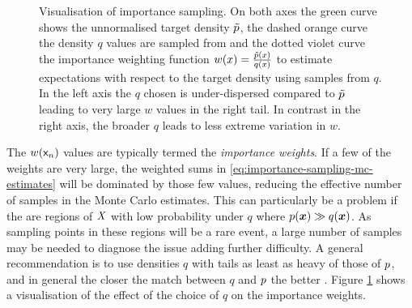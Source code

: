 \begin{figure}[t]
\centering
\pgfplotsset{cycle list/Dark2-3}
\begin{subfigure}[b]{.48\linewidth}
\centering
{}
\end{subfigure}
\begin{subfigure}[b]{.48\linewidth}
\centering
{}
\end{subfigure}
\caption[Visualisation of importance sampling.]{Visualisation of importance sampling. On both axes the green curve shows the unnormalised target density $\tilde{p}$, the dashed orange curve the density $q$ values are sampled from and the dotted violet curve the importance weighting function $w(x) = \frac{\tilde{p}(x)}{q(x)}$ to estimate expectations with respect to the target density using samples from $q$. In the left axis the $q$ chosen is under-dispersed compared to $\tilde{p}$ leading to very large $w$ values in the right tail. In contrast in the right axis, the broader $q$ leads to less extreme variation in $w$.}
\label{fig:importance-sampling}
\end{figure}

The $w(\mathsf{x}_n)$ values are typically termed the \emph{importance weights}. If a few of the weights are very large, the weighted sums in \eqref{eq:importance-sampling-mc-estimates} will be dominated by those few values, reducing the effective number of samples in the Monte Carlo estimates. This can particularly be a problem if the are regions of $\mathit{X}$ with low probability under $q$ where $p(\boldsymbol{x}) \gg q(\boldsymbol{x})$. As sampling points in these regions will be a rare event, a large number of samples may be needed to diagnose the issue adding further difficulty. A general recommendation is to use densities $q$ with tails as least as heavy of those of $p$, and in general the closer the match between $q$ and $p$ the better \citep{mackay2003information,owen2013importance}. Figure \ref{fig:importance-sampling} shows a visualisation of the effect of the choice of $q$ on the importance weights.

